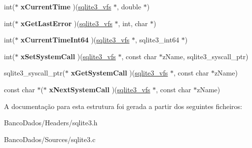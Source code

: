 \begin{DoxyCompactItemize}
\item 
\hypertarget{structsqlite3__vfs_ab85a8a3ab59f76a6685508fefaa7b691}{int($\ast$ {\bfseries x\-Current\-Time} )(\hyperlink{structsqlite3__vfs}{sqlite3\-\_\-vfs} $\ast$, double $\ast$)}\label{structsqlite3__vfs_ab85a8a3ab59f76a6685508fefaa7b691}

\item 
\hypertarget{structsqlite3__vfs_a4994110c79d082f7770ce553d507748f}{int($\ast$ {\bfseries x\-Get\-Last\-Error} )(\hyperlink{structsqlite3__vfs}{sqlite3\-\_\-vfs} $\ast$, int, char $\ast$)}\label{structsqlite3__vfs_a4994110c79d082f7770ce553d507748f}

\item 
\hypertarget{structsqlite3__vfs_aa281584c422969b7f0df0e5f918fc590}{int($\ast$ {\bfseries x\-Current\-Time\-Int64} )(\hyperlink{structsqlite3__vfs}{sqlite3\-\_\-vfs} $\ast$, sqlite3\-\_\-int64 $\ast$)}\label{structsqlite3__vfs_aa281584c422969b7f0df0e5f918fc590}

\item 
\hypertarget{structsqlite3__vfs_a69996d40229d6eabe6869bb3fc80b730}{int($\ast$ {\bfseries x\-Set\-System\-Call} )(\hyperlink{structsqlite3__vfs}{sqlite3\-\_\-vfs} $\ast$, const char $\ast$z\-Name, sqlite3\-\_\-syscall\-\_\-ptr)}\label{structsqlite3__vfs_a69996d40229d6eabe6869bb3fc80b730}

\item 
\hypertarget{structsqlite3__vfs_a604384e58c645e06b6db38d8a45e1103}{sqlite3\-\_\-syscall\-\_\-ptr($\ast$ {\bfseries x\-Get\-System\-Call} )(\hyperlink{structsqlite3__vfs}{sqlite3\-\_\-vfs} $\ast$, const char $\ast$z\-Name)}\label{structsqlite3__vfs_a604384e58c645e06b6db38d8a45e1103}

\item 
\hypertarget{structsqlite3__vfs_ac2930d34749977f39b1bbc27dc1de2b2}{const char $\ast$($\ast$ {\bfseries x\-Next\-System\-Call} )(\hyperlink{structsqlite3__vfs}{sqlite3\-\_\-vfs} $\ast$, const char $\ast$z\-Name)}\label{structsqlite3__vfs_ac2930d34749977f39b1bbc27dc1de2b2}

\end{DoxyCompactItemize}


A documentação para esta estrutura foi gerada a partir dos seguintes ficheiros\-:\begin{DoxyCompactItemize}
\item 
Banco\-Dados/\-Headers/sqlite3.\-h\item 
Banco\-Dados/\-Sources/sqlite3.\-c\end{DoxyCompactItemize}
